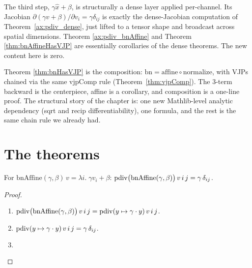 
The third step, \(\gamma \hat{x} + \beta\), is structurally a
dense layer applied per-channel. Its Jacobian
\(\partial(\gamma v + \beta)/\partial v_i = \gamma \delta_{ij}\) is
exactly the dense-Jacobian computation of
Theorem~\ref{ax:pdiv_dense}, just lifted to a tensor shape and
broadcast across spatial dimensions. Theorem
\ref{ax:pdiv_bnAffine} and Theorem \ref{thm:bnAffineHasVJP}
are essentially corollaries of the dense theorems. The new content
here is zero.


Theorem \ref{thm:bnHasVJP} is the composition:
\(\mathrm{bn} = \mathrm{affine} \circ \mathrm{normalize}\), with VJPs
chained via the same \(\mathrm{vjpComp}\) rule
(Theorem~\ref{thm:vjpComp}). The 3-term backward is the
centerpiece, affine is a corollary, and composition is a one-line
proof. The structural story of the chapter is: one new
Mathlib-level analytic dependency (sqrt and recip
differentiability), one formula, and the rest is the same
chain rule we already had.

\section{The theorems}



\begin{theorem}
  \label{ax:pdiv_bnAffine}
  \leanok
  For \(\mathrm{bnAffine}(\gamma, \beta)\, v = \lambda i.\;
  \gamma v_i + \beta\):
  \Prove{} \(\operatorname{pdiv}\bigl(\mathrm{bnAffine}(\gamma, \beta)\bigr)\, v\, i\, j
    = \gamma\, \delta_{ij}\).
\end{theorem}

\begin{proof}
\leanok
\begin{enumerate}
  \item \(\operatorname{pdiv}\bigl(\mathrm{bnAffine}(\gamma, \beta)\bigr)\, v\, i\, j
          = \operatorname{pdiv}(y \mapsto \gamma \cdot y)\, v\, i\, j\).
  \item \(\operatorname{pdiv}(y \mapsto \gamma \cdot y)\, v\, i\, j
          = \gamma\, \delta_{ij}\).
  \item \Qed{}
\end{enumerate}
\end{proof}

